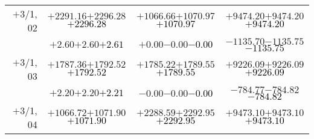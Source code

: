 \documentclass[compress]{beamer}
\begin{document}
\begin{frame}
{\begin{tabular}{r | c | c | c}
$+$3/1, 02 & $+2291.16$\hspace{0.1 cm}$+2296.28$\hspace{0.1 cm}\textcolor{black}{$+2296.28$} & $+1066.66$\hspace{0.1 cm}$+1070.97$\hspace{0.1 cm}\textcolor{black}{$+1070.97$} & $+9474.20$\hspace{0.1 cm}$+9474.20$\hspace{0.1 cm}\textcolor{black}{$+9474.20$} \\
           & $+2.60$\hspace{0.1 cm}$+2.60$\hspace{0.1 cm}\textcolor{black}{$+2.61$} & $+0.00$\hspace{0.1 cm}$-0.00$\hspace{0.1 cm}\textcolor{black}{$-0.00$} & $-1135.70$\hspace{0.1 cm}$-1135.75$\hspace{0.1 cm}\textcolor{black}{$-1135.75$} \\
$+$3/1, 03 & $+1787.36$\hspace{0.1 cm}$+1792.52$\hspace{0.1 cm}\textcolor{black}{$+1792.52$} & $+1785.22$\hspace{0.1 cm}$+1789.55$\hspace{0.1 cm}\textcolor{black}{$+1789.55$} & $+9226.09$\hspace{0.1 cm}$+9226.09$\hspace{0.1 cm}\textcolor{black}{$+9226.09$} \\
           & $+2.20$\hspace{0.1 cm}$+2.20$\hspace{0.1 cm}\textcolor{black}{$+2.21$} & $-0.00$\hspace{0.1 cm}$-0.00$\hspace{0.1 cm}\textcolor{black}{$-0.00$} & $-784.77$\hspace{0.1 cm}$-784.82$\hspace{0.1 cm}\textcolor{black}{$-784.82$} \\
$+$3/1, 04 & $+1066.72$\hspace{0.1 cm}$+1071.90$\hspace{0.1 cm}\textcolor{black}{$+1071.90$} & $+2288.59$\hspace{0.1 cm}$+2292.95$\hspace{0.1 cm}\textcolor{black}{$+2292.95$} & $+9473.10$\hspace{0.1 cm}$+9473.10$\hspace{0.1 cm}\textcolor{black}{$+9473.10$} \\

\end{tabular}}
\end{frame}
\end{document}
